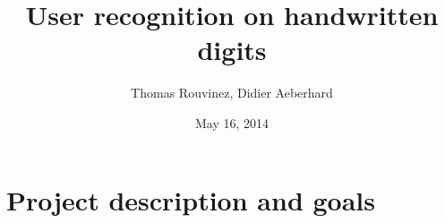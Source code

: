 \documentclass[a4paper]{article}
\begin{document}


\newenvironment{listCustom}{
 \begin{list}{{$\bullet$}}{		%
  \setlength{\partopsep}{0pt}
  \setlength{\parskip}{0pt}
  \setlength{\parsep}{0pt}
  \setlength{\topsep}{5mm}
  \setlength{\itemsep}{1mm}		%
  \setlength{\labelsep}{0.25cm} %
  \setlength{\leftmargin}{2cm}  %
 }
}{
 \end{list}
}

{\setlength{\leftmargini}{2cm} 
\newenvironment{listCustomNumber}{
 \begin{enumerate}{		%
  \setlength{\leftmargin}{2cm}  %
 }
}{
 \end{enumerate}
}

\newcommand*{\xml}[1]{\texttt{<#1>}}

\newcommand*{\webquote}[1]{\textsf{\og #1 \fg{}}}
	

\title{User recognition on handwritten digits}

\author{Thomas Rouvinez, Didier Aeberhard}
\date{May 16, 2014}


\rrno{}
\maketitle

\pagebreak


	
\tableofcontents

\pagebreak



\section{Project description and goals}

}
\end{document}
